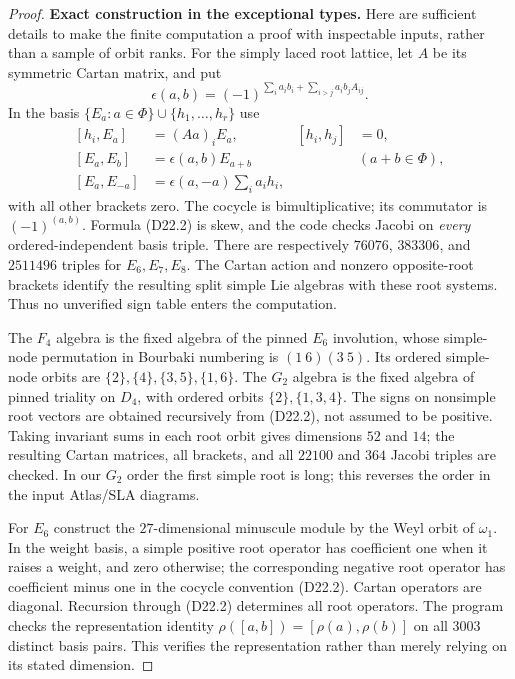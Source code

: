 \begin{proof}
\par\medskip\noindent\textbf{Exact construction in the exceptional types.}\quad
Here are sufficient details to make the finite computation a proof
with inspectable inputs, rather than a sample of orbit ranks.
For the simply laced root lattice, let $A$ be its symmetric Cartan
matrix, and put
\[
 \epsilon(a,b)=(-1)^{\sum_i a_i b_i+
                      \sum_{i>j}a_i b_j A_{ij}}.
\]
In the basis $\{E_a:a\in\Phi\}\cup\{h_1,\ldots,h_r\}$ use
\[
\begin{aligned}
 [h_i,E_a]&=(Aa)_i E_a,& [h_i,h_j]&=0,\\
 [E_a,E_b]&=\epsilon(a,b)E_{a+b}&& (a+b\in\Phi),\\
 [E_a,E_{-a}]&=\epsilon(a,-a)\sum_i a_i h_i,
\end{aligned}                                                     \tag{D22.2}
\]
with all other brackets zero.  The cocycle is bimultiplicative;
its commutator is $(-1)^{(a,b)}$.  Formula (D22.2) is skew, and
the code checks Jacobi on \emph{every} ordered-independent basis
triple.  There are respectively $76076$, $383306$, and $2511496$
triples for $E_6,E_7,E_8$.  The Cartan action and nonzero opposite-root
brackets identify the resulting split simple Lie algebras with these
root systems.  Thus no unverified sign table enters the computation.

The $F_4$ algebra is the fixed algebra of the pinned $E_6$ involution,
whose simple-node permutation in Bourbaki numbering is
$(1\ 6)(3\ 5)$.  Its ordered simple-node orbits are
$\{2\},\{4\},\{3,5\},\{1,6\}$.
The $G_2$ algebra is the fixed algebra of pinned triality on $D_4$,
with ordered orbits $\{2\},\{1,3,4\}$.
The signs on nonsimple root vectors are obtained recursively from
(D22.2), not assumed to be positive.  Taking invariant sums in each
root orbit gives dimensions $52$ and $14$; the resulting Cartan
matrices, all brackets, and all $22100$ and $364$ Jacobi triples
are checked.  In our $G_2$ order the first simple root is long;
this reverses the order in the input Atlas/SLA diagrams.

For $E_6$ construct the $27$-dimensional minuscule module by the
Weyl orbit of $\omega_1$.  In the weight basis, a simple positive
root operator has coefficient one when it raises a weight, and
zero otherwise; the corresponding negative root operator has
coefficient minus one in the cocycle convention (D22.2).
Cartan operators are diagonal.  Recursion through (D22.2) determines
all root operators.  The program checks the representation identity
$\rho([a,b])=[\rho(a),\rho(b)]$ on all $3003$ distinct basis pairs.
This verifies the representation rather than merely relying on
its stated dimension.


\end{proof}
